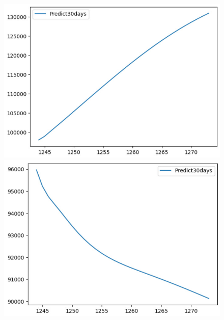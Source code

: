 \begin{figure}[H]
\begin{minipage}{0.15\textwidth}
    \includegraphics[width=1\textwidth]{resources/chapter-5/predicted/VCB_LSTM_8_2_next30days.jpg}
    \end{minipage}
    \hfill
        \begin{minipage}{0.15\textwidth}
    \centering
    \includegraphics[width=1\textwidth]{resources/chapter-5/predicted/VCB_LSTM_9_1_next30days.jpg}
    \end{minipage}
    \hfill
    \begin{minipage}{0.15\textwidth}
    \centering

\end{minipage}
\end{figure}
